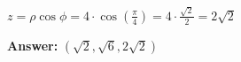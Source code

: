 \documentclass[10pt]{article}                               %
\begin{document}
\begin{defaultbox}
\begin{adjustwidth}{2em}{0pt}
\begin{adjustwidth}{2em}{0pt}
\begin{examplebox}
\begin{adjustwidth}{2em}{0pt}
                        \( z = \rho\cos\phi = 4 \cdot \cos\left(\frac{\pi}{4}\right) = 4 \cdot \frac{\sqrt{2}}{2} = 2\sqrt{2} \)
    
                        \textbf{Answer:} \( \left(\sqrt{2}, \sqrt{6}, 2\sqrt{2}\right) \)
    
                    \end{adjustwidth}
    
                \end{examplebox}

        \end{adjustwidth}

    \end{adjustwidth}

\end{defaultbox}
\end{document}
